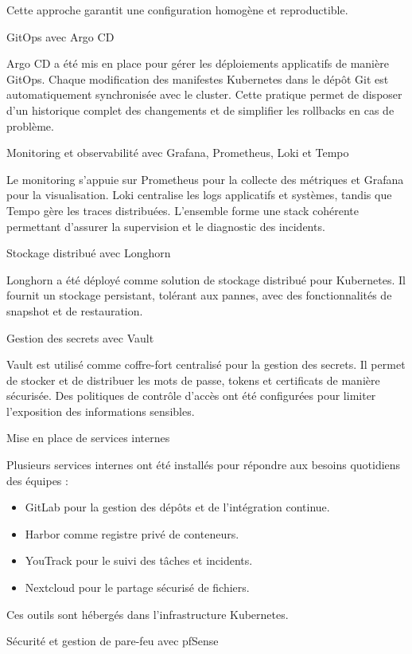 Cette approche garantit une configuration homogène et reproductible.

	{GitOps avec Argo CD}

Argo CD a été mis en place pour gérer les déploiements applicatifs de manière GitOps. Chaque modification des manifestes Kubernetes dans le dépôt Git est automatiquement synchronisée avec le cluster. Cette pratique permet de disposer d’un historique complet des changements et de simplifier les rollbacks en cas de problème.

{Monitoring et observabilité avec Grafana, Prometheus, Loki et Tempo}

Le monitoring s’appuie sur Prometheus pour la collecte des métriques et Grafana pour la visualisation. Loki centralise les logs applicatifs et systèmes, tandis que Tempo gère les traces distribuées. L’ensemble forme une stack cohérente permettant d’assurer la supervision et le diagnostic des incidents.

	{Stockage distribué avec Longhorn}

Longhorn a été déployé comme solution de stockage distribué pour Kubernetes. Il fournit un stockage persistant, tolérant aux pannes, avec des fonctionnalités de snapshot et de restauration.

	{Gestion des secrets avec Vault}

Vault est utilisé comme coffre-fort centralisé pour la gestion des secrets. Il permet de stocker et de distribuer les mots de passe, tokens et certificats de manière sécurisée. Des politiques de contrôle d’accès ont été configurées pour limiter l’exposition des informations sensibles.

	{Mise en place de services internes}

Plusieurs services internes ont été installés pour répondre aux besoins quotidiens des équipes :

\begin{itemize}
	\item GitLab pour la gestion des dépôts et de l’intégration continue.
	\item Harbor comme registre privé de conteneurs.
	\item YouTrack pour le suivi des tâches et incidents.
	\item Nextcloud pour le partage sécurisé de fichiers.
\end{itemize}

Ces outils sont hébergés dans l’infrastructure Kubernetes.

	{Sécurité et gestion de pare-feu avec pfSense}

